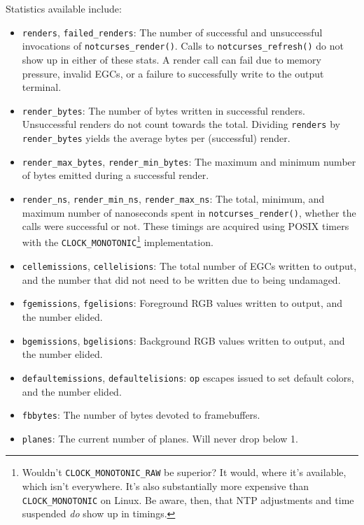 \documentclass[letterpaper,10pt]{article}
\newenvironment{denseitemize}{
  \begin{itemize}
      \setlength{\itemsep}{0pt}
}{
  \end{itemize}
}
\begin{document}
Statistics available include:
\begin{denseitemize}
\item{\texttt{renders}, \texttt{failed\_renders}: The number of successful and unsuccessful
    invocations of \texttt{notcurses\_render()}. Calls to \texttt{notcurses\_refresh()} do
    not show up in either of these stats. A render call can fail due to
    memory pressure, invalid EGCs, or a failure to successfully write to the
    output terminal.}
\item{\texttt{render\_bytes}: The number of bytes written in successful renders.
    Unsuccessful renders do not count towards the total. Dividing \texttt{renders}
  by \texttt{render\_bytes} yields the average bytes per (successful) render.}
\item{\texttt{render\_max\_bytes}, \texttt{render\_min\_bytes}: The maximum and
  minimum number of bytes emitted during a successful render.}
\item{\texttt{render\_ns}, \texttt{render\_min\_ns}, \texttt{render\_max\_ns}:
  The total, minimum, and maximum number of nanoseconds spent in \texttt{notcurses\_render()},
  whether the calls were successful or not. These timings are acquired using
  POSIX timers\cite{clockgettime} with the
  \texttt{CLOCK\_MONOTONIC}\footnote{Wouldn't \texttt{CLOCK\_MONOTONIC\_RAW} be
  superior? It would, where it's available, which isn't everywhere. It's also
  substantially more expensive than \texttt{CLOCK\_MONOTONIC} on Linux. Be
  aware, then, that NTP adjustments and time suspended \textit{do} show up in
  timings.} implementation.}
\item{\texttt{cellemissions}, \texttt{cellelisions}: The total number of EGCs
  written to output, and the number that did not need to be written due to
  being undamaged.}
\item{\texttt{fgemissions}, \texttt{fgelisions}: Foreground RGB values written to output, and the number elided.}
\item{\texttt{bgemissions}, \texttt{bgelisions}: Background RGB values written to output, and the number elided.}
\item{\texttt{defaultemissions}, \texttt{defaultelisions}: \texttt{op} escapes issued to set default colors, and the number elided.}
\item{\texttt{fbbytes}: The number of bytes devoted to framebuffers.}
\item{\texttt{planes}: The current number of planes. Will never drop below 1.}
\end{denseitemize}
\end{document}
